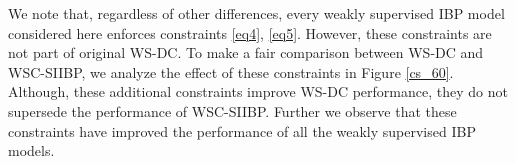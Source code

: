 \documentclass[runningheads]{llncs}
\begin{document}

 We note that, regardless of other differences, every weakly supervised IBP model considered here enforces constraints \eqref{eq4}, \eqref{eq5}. However, these constraints are not part of original WS-DC. To make a fair comparison between WS-DC and WSC-SIIBP, we analyze the effect of these constraints in Figure \ref{cs_60}. Although, these additional constraints improve WS-DC performance, they do not supersede the performance of WSC-SIIBP. Further we observe that these constraints have improved the performance of all the weakly supervised IBP models.
\end{document}
